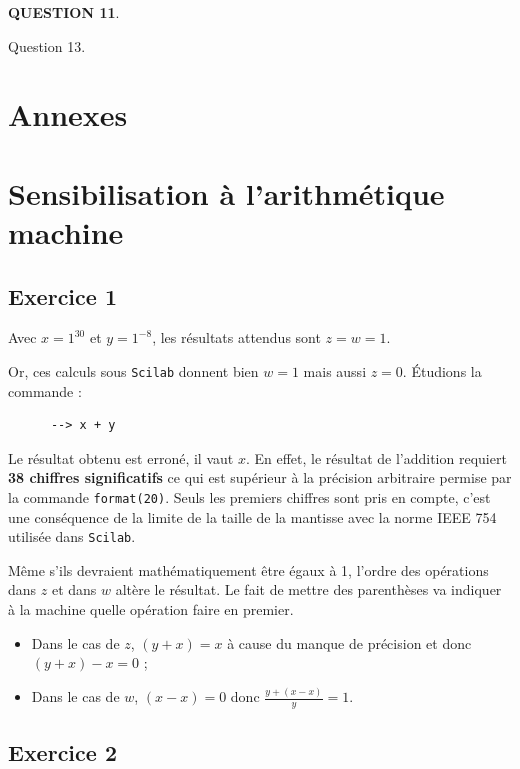 \documentclass[a4paper,11pt]{article}
\newcommand{\quest}[1]{\small\textbf{#1}\normalsize}
\theoremstyle{nonumberplain}
\theoremstyle{nonumberplain}
\theoremstyle{nonumberplain}
\begin{document}
    \quest{QUESTION 11}.


Question 13.
\newline

\section*{Annexes}

\vspace{8cm}

\section{Sensibilisation à l'arithmétique machine}
\subsection*{Exercice 1}

    Avec $x = 1^{30}$ et $y = 1^{-8}$, les résultats attendus sont $z = w = 1$.

    Or, ces calculs sous \texttt{Scilab} donnent bien $w = 1$ mais aussi $z = 0$. \'{E}tudions la commande :
    \begin{verbatim}
      --> x + y
    \end{verbatim}
    Le résultat obtenu est erroné, il vaut $x$. En effet, le résultat de l'addition requiert \textbf{38 chiffres significatifs} ce qui est supérieur à la précision arbitraire permise par la commande \texttt{format(20)}.
    Seuls les premiers chiffres sont pris en compte, c'est une conséquence de la limite de la taille de la mantisse avec la norme IEEE 754 utilisée dans \texttt{Scilab}.
    \newline

    Même s'ils devraient mathématiquement être égaux à 1, l'ordre des opérations dans $z$ et dans $w$ altère le résultat.
    Le fait de mettre des parenthèses va indiquer à la machine quelle opération faire en premier.
    \begin{itemize}
        \item Dans le cas de $z$, $(y + x) = x$ à cause du manque de précision et donc $(y + x) - x = 0$ ;
        \item Dans le cas de $w$, $(x - x) = 0$ donc $\frac{y + (x -x)}{y} = 1$.
    \end{itemize}


\subsection*{Exercice 2}
\end{document}
